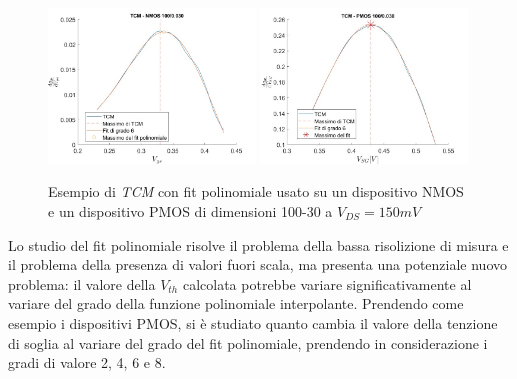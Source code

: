 \documentclass[12pt, letterpaper]{book}
\begin{document}
\begin{figure}[h!]
  \centering
  \includegraphics[width=0.49\textwidth]{TCM-N4-100-30}
  \includegraphics[width=0.49\textwidth]{TCM-P1-100-30}
  \caption{Esempio di \emph{TCM} con fit polinomiale usato su un dispositivo NMOS e un dispositivo PMOS di dimensioni 100-30 a $V_{DS} = 150 mV$}
\end{figure}

Lo studio del fit polinomiale risolve il problema della bassa risolizione di misura e il problema della presenza di valori fuori scala, ma presenta una potenziale nuovo problema: il valore della $V_{th}$ calcolata potrebbe variare significativamente al variare del grado della funzione polinomiale interpolante.
Prendendo come esempio i dispositivi PMOS, si è studiato quanto cambia il valore della tenzione di soglia al variare del grado del fit polinomiale, prendendo in considerazione i gradi di valore 2, 4, 6 e 8.\\
\end{document}

